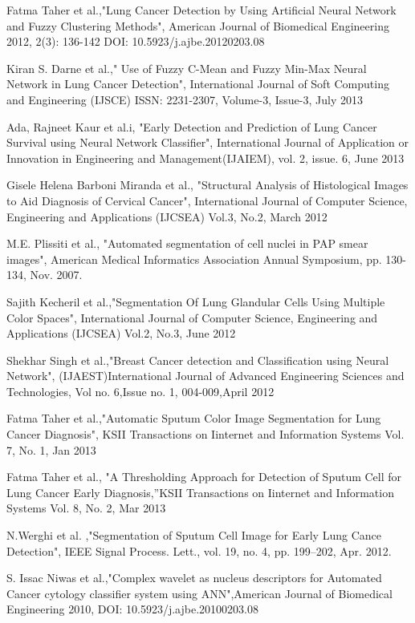 




\begin{thebibliography}{99}

Fatma Taher et al.,"Lung Cancer Detection by Using Artificial Neural Network and Fuzzy Clustering Methods",
American Journal of Biomedical Engineering 2012, 2(3): 136-142
DOI: 10.5923/j.ajbe.20120203.08

Kiran S. Darne et al.," Use of Fuzzy C-Mean and Fuzzy Min-Max Neural Network in Lung Cancer Detection",
International Journal of Soft Computing and Engineering (IJSCE)
ISSN: 2231-2307, Volume-3, Issue-3, July 2013

Ada, Rajneet Kaur et al.i, "Early Detection and Prediction of Lung Cancer
Survival using Neural Network Classifier", International Journal of Application or Innovation in
 Engineering and Management(IJAIEM), vol. 2, issue. 6, June 2013

Gisele Helena Barboni Miranda et al., "Structural Analysis of Histological Images to Aid
Diagnosis of Cervical Cancer", 
International Journal of Computer Science, 
Engineering and Applications (IJCSEA) Vol.3, No.2, March 2012

M.E. Plissiti et al., "Automated segmentation of cell 
nuclei in PAP smear images",
American Medical Informatics Association
Annual Symposium, pp. 130-134, Nov. 2007.

Sajith Kecheril et al.,"Segmentation Of Lung 
Glandular Cells Using Multiple Color Spaces", International Journal of Computer Science, 
Engineering and Applications (IJCSEA) Vol.2, No.3, June 2012

Shekhar Singh et al.,"Breast Cancer detection and Classification using Neural Network",
(IJAEST)International Journal of Advanced Engineering Sciences and Technologies, Vol no. 6,Issue no. 1, 004-009,April 2012

Fatma Taher et al.,"Automatic Sputum Color Image Segmentation for Lung Cancer Diagnosis",
KSII Transactions on Iinternet and Information Systems Vol. 7, No. 1, Jan 2013

Fatma Taher et al., "A Thresholding Approach for Detection of Sputum Cell for
 Lung Cancer Early Diagnosis,”KSII Transactions on Iinternet and Information Systems Vol. 8, No. 2, Mar 2013

N.Werghi et al. ,"Segmentation of Sputum Cell Image for Early Lung Cance Detection", IEEE Signal Process. Lett., vol.
19, no. 4, pp. 199–202, Apr. 2012.

S. Issac Niwas et al.,"Complex wavelet as nucleus descriptors for Automated Cancer cytology
classifier system using ANN",American Journal of Biomedical Engineering 2010,
DOI: 10.5923/j.ajbe.20100203.08








\end{thebibliography}
